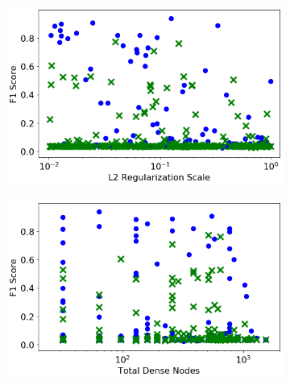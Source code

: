 \begin{figure}[H]
    \begin{subfigure}[b]{0.49\textwidth}
         \centering
         \includegraphics[width=\textwidth]{images/dnn_l2_reg.png}
         \caption{}
         \label{fig:dnn_l2_reg}
     \end{subfigure}
     \hfill
     \begin{subfigure}[b]{0.49\textwidth}
         \centering
         \includegraphics[width=\textwidth]{images/dnn_dense_nodes_total.png}
         \caption{}
         \label{fig:dnn_dense_nodes_total}
     \end{subfigure}     


\end{figure}
